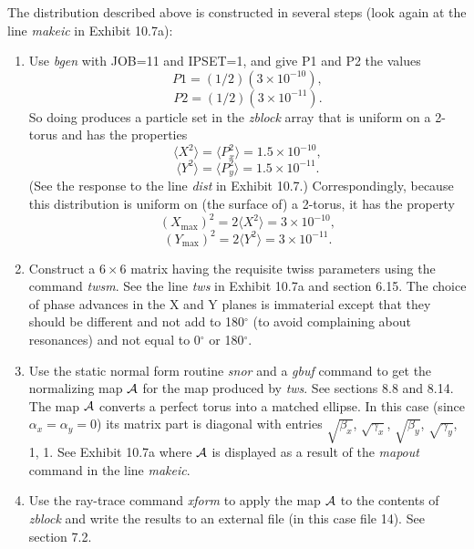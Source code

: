 The distribution described above is constructed in several steps (look
again at the line {\em makeic} in Exhibit 10.7a):
\begin{enumerate}
\item Use {\em bgen} with JOB=11 and IPSET=1, and give P1 and P2 the
values
\[
P1 = (1/2)(3 \times 10^{-10}),
\]
\begin{equation}
P2 = (1/2)(3 \times 10^{-11}).
\end{equation}
So doing produces a particle set in the {\em zblock} array that is
uniform on a  2-torus and has the properties
\[
\langle X^2\rangle = \langle P^2_x\rangle = 1.5 \times 10^{-10},
\]
\begin{equation}
\langle Y^2\rangle = \langle P^2_y\rangle = 1.5 \times 10^{-11}.
\end{equation}
(See the response to the line {\em dist} in Exhibit 10.7.)
Correspondingly, because this distribution is uniform on (the surface of)
a 2-torus, it has the property
\[
(X_{\max})^2 = 2\langle X^2\rangle = 3 \times 10^{-10},
\]
\begin{equation}
(Y_{\max})^2 = 2\langle Y^2\rangle = 3 \times 10^{-11}.
\end{equation}

\item Construct a $6 \times 6$ matrix having the requisite twiss
parameters using the command {\em twsm}.  See the line {\em tws} in
Exhibit 10.7a and section 6.15.  The choice of phase advances in the X and
Y planes is immaterial except that they should be different and not add
to 180$^{\circ}$ (to avoid \Mary
complaining about resonances) and not equal to 0$^{\circ}$ or 180$^{\circ}$.

\item Use the static normal form routine {\em snor} and a {\em gbuf}
command to get the normalizing map ${\cal A}$ for the map produced by
{\em tws}.  See sections 8.8 and 8.14.  The map ${\cal A}$ converts a
perfect torus into a matched ellipse.  In this case (since $\alpha_x =
\alpha_y = 0$) its matrix part is diagonal with entries $\sqrt{\beta_x}$,
$\sqrt{\gamma_x}$, $\sqrt{\beta_y}$, $\sqrt{\gamma_y}$, 1, 1.  See
Exhibit 10.7a where ${\cal A}$ is displayed as a result of the {\em
mapout} command in the line {\em makeic}.

\item Use the ray-trace command {\em xform} to apply the map ${\cal A}$
to the contents of {\em zblock} and write the results to an external file
(in
this case file 14).  See section 7.2.


\end{enumerate}
